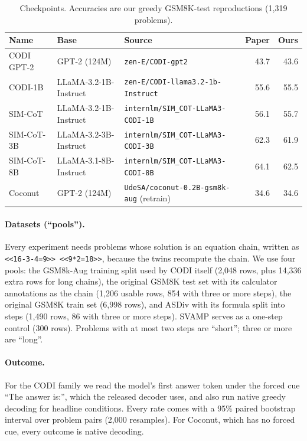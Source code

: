 \documentclass{article}
\begin{document}
\begin{table}[h]
\caption{Checkpoints. Accuracies are our greedy GSM8K-test reproductions (1{,}319 problems).}
\label{tab:models}
\centering
\small
\begin{tabular}{lllrr}
\toprule
Name & Base & Source & Paper & Ours \\
\midrule
CODI GPT-2 & GPT-2 (124M) & \texttt{zen-E/CODI-gpt2} & 43.7 & 43.6 \\
CODI-1B & LLaMA-3.2-1B-Instruct & \texttt{zen-E/CODI-llama3.2-1b-Instruct} & 55.6 & 55.5 \\
SIM-CoT & LLaMA-3.2-1B-Instruct & \texttt{internlm/SIM\_COT-LLaMA3-CODI-1B} & 56.1 & 55.7 \\
SIM-CoT-3B & LLaMA-3.2-3B-Instruct & \texttt{internlm/SIM\_COT-LLaMA3-CODI-3B} & 62.3 & 61.9 \\
SIM-CoT-8B & LLaMA-3.1-8B-Instruct & \texttt{internlm/SIM\_COT-LLaMA3-CODI-8B} & 64.1 & 62.5 \\
Coconut & GPT-2 (124M) & \texttt{UdeSA/coconut-0.2B-gsm8k-aug} (retrain) & 34.6 & 34.6 \\
\bottomrule
\end{tabular}
\end{table}

\paragraph{Datasets (``pools'').} Every experiment needs problems whose solution is an equation chain, written as \texttt{<<16-3-4=9>> <<9*2=18>>}, because the twins recompute the chain. We use four pools: the GSM8k-Aug training split used by CODI itself (2{,}048 rows, plus 14{,}336 extra rows for long chains), the original GSM8K test set with its calculator annotations as the chain (1{,}206 usable rows, 854 with three or more steps), the original GSM8K train set (6{,}998 rows), and ASDiv \citep{miao2020asdiv} with its formula split into steps (1{,}490 rows, 86 with three or more steps). SVAMP \citep{patel2021svamp} serves as a one-step control (300 rows). Problems with at most two steps are ``short''; three or more are ``long''.

\paragraph{Outcome.} For the CODI family we read the model's first answer token under the forced cue ``The answer is:'', which the released decoder uses, and also run native greedy decoding for headline conditions. Every rate comes with a 95\% paired bootstrap interval over problem pairs (2{,}000 resamples). For Coconut, which has no forced cue, every outcome is native decoding.
\end{document}
